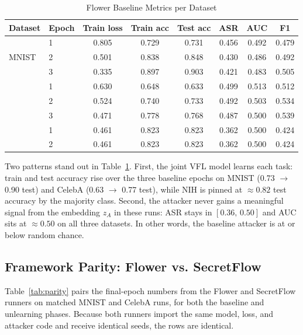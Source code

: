 \documentclass[sigconf,anonymous]{acmart}
\begin{document}
\begin{table}[t]
\centering
\small
\caption{Flower Baseline Metrics per Dataset}
\label{tab:baseline}
\begin{tabular}{@{}llcccccc@{}}
\toprule
Dataset & Epoch & Train loss & Train acc & Test acc & ASR & AUC & F1 \\
\midrule
\multirow{3}{*}{MNIST}
    & 1 & 0.805 & 0.729 & 0.731 & 0.456 & 0.492 & 0.479 \\
    & 2 & 0.501 & 0.838 & 0.848 & 0.430 & 0.486 & 0.492 \\
    & 3 & 0.335 & 0.897 & 0.903 & 0.421 & 0.483 & 0.505 \\
\addlinespace[2pt]
\multirow{3}{*}{CelebA}
    & 1 & 0.630 & 0.648 & 0.633 & 0.499 & 0.513 & 0.512 \\
    & 2 & 0.524 & 0.740 & 0.733 & 0.492 & 0.503 & 0.534 \\
    & 3 & 0.471 & 0.778 & 0.768 & 0.487 & 0.500 & 0.539 \\
\addlinespace[2pt]
\multirow{2}{*}{NIH Chest X-ray14}
    & 1 & 0.461 & 0.823 & 0.823 & 0.362 & 0.500 & 0.424 \\
    & 2 & 0.461 & 0.823 & 0.823 & 0.362 & 0.500 & 0.424 \\
\bottomrule
\end{tabular}
\end{table}

Two patterns stand out in Table~\ref{tab:baseline}. First, the joint VFL model learns each task: train and test accuracy rise over the three baseline epochs on MNIST (0.73 $\rightarrow$ 0.90 test) and CelebA (0.63 $\rightarrow$ 0.77 test), while NIH is pinned at $\approx 0.82$ test accuracy by the majority class. Second, the attacker never gains a meaningful signal from the embedding $z_A$ in these runs: ASR stays in $[0.36,\,0.50]$ and AUC sits at $\approx 0.50$ on all three datasets. In other words, the baseline attacker is at or below random chance.

\subsection{Framework Parity: Flower vs. SecretFlow}

Table~\ref{tab:parity} pairs the final-epoch numbers from the Flower and SecretFlow runners on matched MNIST and CelebA runs, for both the baseline and unlearning phases. Because both runners import the same model, loss, and attacker code and receive identical seeds, the rows are identical.
\end{document}
